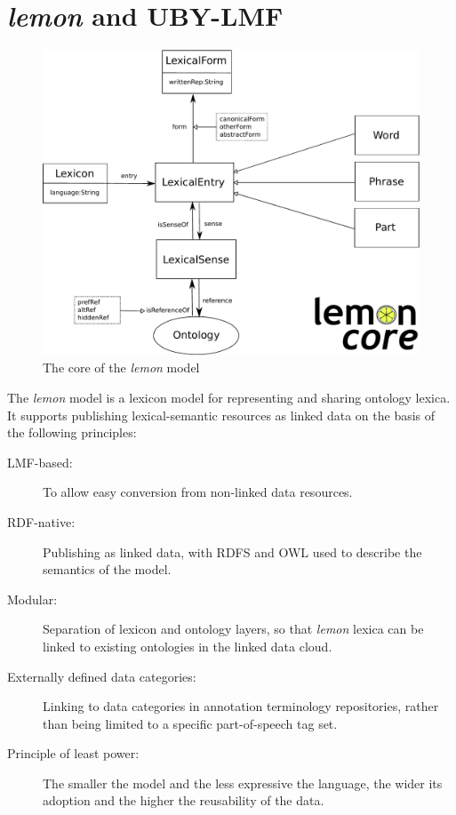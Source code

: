 \section{\emph{lemon} and UBY-LMF}
\begin{figure}
 \begin{center}

 	 \includegraphics[width=1.0\columnwidth]{images/lemon-core}

 \end{center}
\caption{The core of the \emph{lemon} model\label{lemon-core}}
\end{figure}

The \emph{lemon} model\cite{mccrae2012interchanging} is a  lexicon model for representing and sharing ontology lexica.
It supports publishing 
lexical-semantic resources as linked data on the basis of the following principles:

\begin{description} 
\item[LMF-based:]{To allow easy conversion from non-linked data resources.}
\item[RDF-native:]{Publishing as linked data, with RDFS and OWL used to describe
  the semantics of the model.}
\item[Modular:]{Separation of lexicon and ontology layers, so that \emph{lemon} lexica can be linked to existing ontologies
in the linked data cloud.}
\item[Externally defined data categories:]{Linking to data categories in
  annotation terminology repositories, rather than being limited to a specific part-of-speech tag set.}
\item[Principle of least power:]{The smaller the model and the less expressive the language, 
	the wider its adoption and the higher the reusability of the
	data\cite{shadbolt2006semantic}.}
\end{description}

